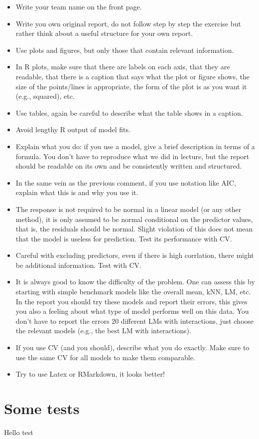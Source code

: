 \documentclass[
]{article}
\begin{document}
\begin{itemize}
\item
Write your team name on the front page.
\item
Write you own original report, do not follow step by step the exercise but rather think about a useful structure for your own report.
\item 
Use plots and figures, but only those that contain relevant information.
\item
In R plots, make sure that there are labels on each axis, that they are readable, that there is a caption that says what the plot or figure shows, the size of the points/lines is appropriate, the form of the plot is as you want it (e.g., squared), etc.
\item
Use tables, again be careful to describe what the table shows in a caption.
\item 
Avoid lengthy R output of model fits.
\item
Explain what you do: if you use a model, give a brief description in terms of a formula. You don't have to reproduce what we did in lecture, but the 
report should be readable on its own and be consistently written and structured.
\item
In the same vein as the previous comment, if you use notation like AIC, explain what this is and why you use it.
\item
The response is not required to be normal in a linear model (or any other method), it is only assumed to be normal conditional on the predictor values, that is, the residuals should be normal. Slight violation of this does not mean that the model is useless for prediction. Test its performance with CV.
\item
Careful with excluding predictors, even if there is high corrlation, there might be additional information. Test with CV.
\item
It is always good to know the difficulty of the problem. One can assess this by starting with simple benchmark models like the overall mean, kNN, LM, etc. In the report you should try these models and report their errors, this gives you also a feeling about what type of model performs well on this data. You don't have
to report the errors 20 different LMs with interactions, just choose the relevant models (e.g., the best LM with interactions).
\item
If you use CV (and you should), describe what you do exactly. Make sure to use the same CV for all models to make them comparable.
\item
Try to use Latex or RMarkdown, it looks better!
\end{itemize}

\section{Some tests}

Hello test
\end{document}
